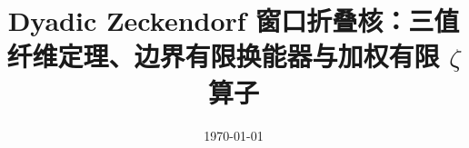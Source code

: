 \documentclass[11pt,letterpaper]{ctexart}
\title{Dyadic Zeckendorf 窗口折叠核：三值纤维定理、边界有限换能器与加权有限 $\zeta$ 算子}
\author{}
\date{\today}
\begin{document}
\maketitle












\FloatBarrier
\appendix


\FloatBarrier

\end{document}
